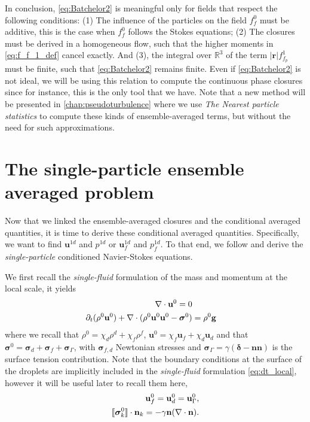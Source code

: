 In conclusion, \ref{eq:Batchelor2}  is meaningful only for fields that respect the following conditions: 
(1) The influence of the particles on the field $f_f^0$ must be additive, this is the case when ${f_f^0}$ follows the Stokes equations; 
(2) The closures must be derived in a homogeneous flow, such that the higher moments in \ref{eq:f_f_1_def} cancel exactly. 
And (3), the integral over $\mathbb{R}^3$ of the term $|\textbf{r}| f_{f_p}^1$ must be finite, such that \ref{eq:Batchelor2} remains finite. 
Even if \ref{eq:Batchelor2} is not ideal, we will be using this relation to compute the continuous phase closures since for instance, this is the only tool that we have. 
Note that a new method will be presented in \ref{chap:pseudoturbulence} where we use \textit{The Nearest particle statistics} \citep{zhang2021ensemble} to compute these kinds of ensemble-averaged terms, but without the need for such approximations.


\section{The single-particle ensemble averaged problem}
\label{sec:the_disturbance_eq}

Now that we linked the ensemble-averaged closures and the conditional averaged quantities, it is time to derive these conditional averaged quantities. 
Specifically, we want to find $\textbf{u}^{1d}$ and $p^{1d}$ or $\textbf{u}^{1d}_f$ and $p^{1d}_f$. 
To that end, we follow \citep{zhang1994averaged} and derive the \textit{single-particle} conditioned Navier-Stokes equations. 

We first recall the \textit{single-fluid} formulation of the mass and momentum at the local scale, it yields
\begin{align}
    \div \textbf{u}^0 = 0 \\
    \pddt (\rho^0\textbf{u}^0)
    + \div (\rho^0\textbf{u}^0\textbf{u}^0 - \bm\sigma^0)
    &= \rho^0 \textbf{g}
    \label{eq:dt_local}
\end{align}
where we recall that $\rho^0 = \chi_d \rho^d + \chi_f \rho^f$, $\textbf{u}^0 = \chi_f \textbf{u}_f + \chi_d \textbf{u}_d$ and that $\bm\sigma^0 = \bm\sigma_d + \bm\sigma_f + \bm\sigma_\Gamma$, with $\bm\sigma_{f,d}$ Newtonian stresses and $\bm\sigma_\Gamma = \gamma ( \bm\delta - \textbf{nn})$ is the surface tension contribution. 
Note that the boundary conditions at the surface of the droplets are implicitly included in the \textit{single-fluid} formulation \eqref{eq:dt_local}, however it will be useful later to recall them here, 
\begin{align}
    \label{eq:dt_rho_I3}
    \textbf{u}_f^0 = \textbf{u}_d^0 = \textbf{u}_\Gamma^0, \\
    \Jump{\bm{\sigma}_k^0} 
    =
    -\gamma\textbf{n}(\div \textbf{n}). 
    \label{eq:dt_rho_I2}
\end{align}

